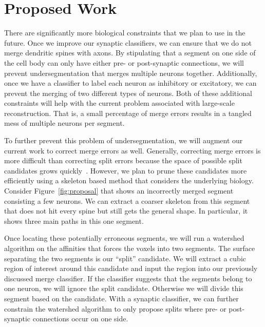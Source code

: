 \section{Proposed Work}

There are significantly more biological constraints that we plan to use in the future.
Once we improve our synaptic classifiers, we can ensure that we do not merge dendritic spines with axons. 
By stipulating that a segment on one side of the cell body can only have either pre- or post-synaptic connections, we will prevent undersegmentation that merges multiple neurons together.
Additionally, once we have a classifier to label each neuron as inhibitory or excitatory, we can prevent the merging of two different types of neurons.
Both of these additional constraints will help with the current problem associated with large-scale reconstruction.
That is, a small percentage of merge errors results in a tangled mess of multiple neurons per segment.

To further prevent this problem of undersegmentation, we will augment our current work to correct merge errors as well.
Generally, correcting merge errors is more difficult than correcting split errors because the space of possible split candidates grows quickly~\cite{parag2015properties}. 
However, we plan to prune these candidates more efficiently using a skeleton based method that considers the underlying biology.
Consider Figure~\ref{fig:proposal} that shows an incorrectly merged segment consisting a few neurons.
We can extract a coarser skeleton from this segment that does not hit every spine but still gets the general shape.
In particular, it shows three main paths in this one segment.

Once locating these potentially erroneous segments, we will run a watershed algorithm on the affinities that forces the voxels into two segments.
The surface separating the two segments is our ``split'' candidate.
We will extract a cubic region of interest around this candidate and input the region into our previously discussed merge classifier.
If the classifier suggests that the segments belong to one neuron, we will ignore the split candidate.
Otherwise we will divide this segment based on the candidate.
With a synaptic classifier, we can further constrain the watershed algorithm to only propose splits where pre- or post-synaptic connections occur on one side.

